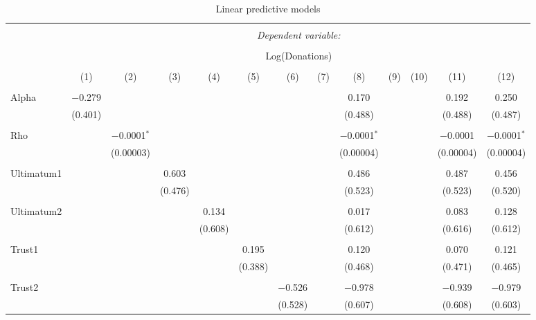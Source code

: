 \documentclass[12pt]{article}
\begin{document}
\begin{table}[!htbp] \centering 
  \caption{Linear predictive models} 
  \label{} 
  \begin{adjustbox}{width=\textwidth}
  \begin{tabular}{@{\extracolsep{5pt}}lcccccccccccc} 
\\[-1.8ex]\hline 
\hline \\[-1.8ex] 
 & \multicolumn{12}{c}{\textit{Dependent variable:}} \\ 
\cline{2-13} 
\\[-1.8ex] & \multicolumn{12}{c}{Log(Donations)} \\ 
\\[-1.8ex] & (1) & (2) & (3) & (4) & (5) & (6) & (7) & (8) & (9) & (10) & (11) & (12)\\ 
\hline \\[-1.8ex] 
 Alpha & $-$0.279 &  &  &  &  &  &  & 0.170 &  &  & 0.192 & 0.250 \\ 
  & (0.401) &  &  &  &  &  &  & (0.488) &  &  & (0.488) & (0.487) \\ 
  & & & & & & & & & & & & \\ 
 Rho &  & $-$0.0001$^{*}$ &  &  &  &  &  & $-$0.0001$^{*}$ &  &  & $-$0.0001 & $-$0.0001$^{*}$ \\ 
  &  & (0.00003) &  &  &  &  &  & (0.00004) &  &  & (0.00004) & (0.00004) \\ 
  & & & & & & & & & & & & \\ 
 Ultimatum1 &  &  & 0.603 &  &  &  &  & 0.486 &  &  & 0.487 & 0.456 \\ 
  &  &  & (0.476) &  &  &  &  & (0.523) &  &  & (0.523) & (0.520) \\ 
  & & & & & & & & & & & & \\ 
 Ultimatum2 &  &  &  & 0.134 &  &  &  & 0.017 &  &  & 0.083 & 0.128 \\ 
  &  &  &  & (0.608) &  &  &  & (0.612) &  &  & (0.616) & (0.612) \\ 
  & & & & & & & & & & & & \\ 
 Trust1 &  &  &  &  & 0.195 &  &  & 0.120 &  &  & 0.070 & 0.121 \\ 
  &  &  &  &  & (0.388) &  &  & (0.468) &  &  & (0.471) & (0.465) \\ 
  & & & & & & & & & & & & \\ 
 Trust2 &  &  &  &  &  & $-$0.526 &  & $-$0.978 &  &  & $-$0.939 & $-$0.979 \\ 
  &  &  &  &  &  & (0.528) &  & (0.607) &  &  & (0.608) & (0.603) \\ 

\end{tabular}
\end{adjustbox}
\end{table}
\end{document}
